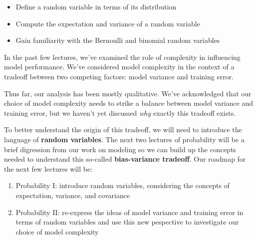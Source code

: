 \documentclass[
  letterpaper,
  DIV=11,
  numbers=noendperiod]{scrreprt}
\providecommand{\tightlist}{%
  \setlength{\itemsep}{0pt}\setlength{\parskip}{0pt}}\usepackage{longtable,booktabs,array}
\begin{document}
\begin{tcolorbox}[enhanced jigsaw, bottomrule=.15mm, breakable, colbacktitle=quarto-callout-note-color!10!white, coltitle=black, opacitybacktitle=0.6, colback=white, bottomtitle=1mm, toprule=.15mm, title=\textcolor{quarto-callout-note-color}{\faInfo}\hspace{0.5em}{Note}, titlerule=0mm, arc=.35mm, leftrule=.75mm, toptitle=1mm, colframe=quarto-callout-note-color-frame, rightrule=.15mm, opacityback=0, left=2mm]

\begin{itemize}
\tightlist
\item
  Define a random variable in terms of its distribution
\item
  Compute the expectation and variance of a random variable
\item
  Gain familiarity with the Bernoulli and binomial random variables
\end{itemize}

\end{tcolorbox}

In the past few lectures, we've examined the role of complexity in
influencing model performance. We've considered model complexity in the
context of a tradeoff between two competing factors: model variance and
training error.

Thus far, our analysis has been mostly qualitative. We've acknowledged
that our choice of model complexity needs to strike a balance between
model variance and training error, but we haven't yet discussed
\emph{why} exactly this tradeoff exists.

To better understand the origin of this tradeoff, we will need to
introduce the language of \textbf{random variables}. The next two
lectures of probability will be a brief digression from our work on
modeling so we can build up the concepts needed to understand this
so-called \textbf{bias-variance tradeoff}. Our roadmap for the next few
lectures will be:

\begin{enumerate}
\def\labelenumi{\arabic{enumi}.}
\tightlist
\item
  Probability I: introduce random variables, considering the concepts of
  expectation, variance, and covariance
\item
  Probability II: re-express the ideas of model variance and training
  error in terms of random variables and use this new pespective to
  investigate our choice of model complexity
\end{enumerate}
\end{document}
